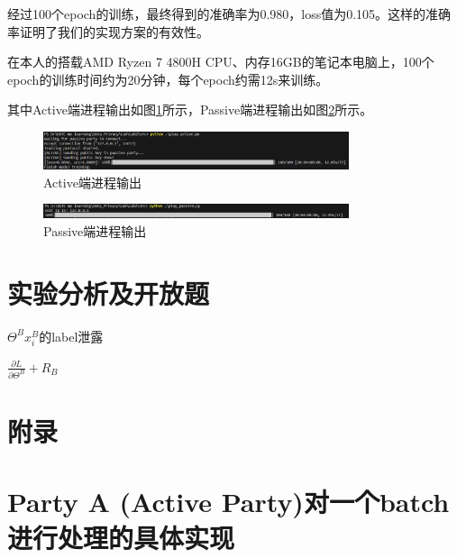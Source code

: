 \documentclass[twoside,11pt]{article}
\begin{document}
经过100个epoch的训练，最终得到的准确率为0.980，loss值为0.105。这样的准确率证明了我们的实现方案的有效性。

在本人的搭载AMD Ryzen 7 4800H CPU、内存16GB的笔记本电脑上，100个epoch的训练时间约为20分钟，每个epoch约需12s来训练。

其中Active端进程输出如图\ref{fig:active}所示，Passive端进程输出如图\ref{fig:passive}所示。

\begin{figure}[htbp]
    \centering
    \includegraphics[width=0.8\textwidth]{pic/active-output.png}
    \caption{Active端进程输出}
    \label{fig:active}
\end{figure}

\begin{figure}[htbp]
    \centering
    \includegraphics[width=0.8\textwidth]{pic/passive-output.png}
    \caption{Passive端进程输出}
    \label{fig:passive}
\end{figure}


\section{实验分析及开放题}

$\Theta^B x_i^B$的label泄露

$\frac{\partial L}{\partial \Theta^B}+R_B$

\appendix
\section*{附录}

\section{Party A (Active Party)对一个batch进行处理的具体实现}
\end{document}
